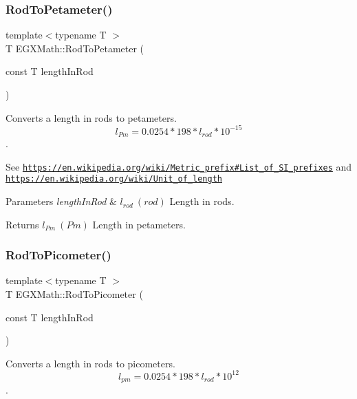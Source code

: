 \subsubsection{\texorpdfstring{Rod\+To\+Petameter()}{RodToPetameter()}}
{\footnotesize\ttfamily template$<$typename T $>$ \\
T E\+G\+X\+Math\+::\+Rod\+To\+Petameter (\begin{DoxyParamCaption}\item[{const T}]{length\+In\+Rod }\end{DoxyParamCaption})}



Converts a length in rods to petameters. \[ l_{Pm}=0.0254 * 198 * l_{rod} * 10^{-15} \]. 

See \href{https://en.wikipedia.org/wiki/Metric_prefix#List_of_SI_prefixes}{\tt https\+://en.\+wikipedia.\+org/wiki/\+Metric\+\_\+prefix\#\+List\+\_\+of\+\_\+\+S\+I\+\_\+prefixes} and \href{https://en.wikipedia.org/wiki/Unit_of_length}{\tt https\+://en.\+wikipedia.\+org/wiki/\+Unit\+\_\+of\+\_\+length} 
\begin{DoxyParams}{Parameters}
{\em length\+In\+Rod} & $ l_{rod}\ (rod)$ Length in rods. \\
\hline
\end{DoxyParams}
\begin{DoxyReturn}{Returns}
$ l_{Pm}\ (Pm)$ Length in petameters. 
\end{DoxyReturn}
\mbox{\label{group___e_g_x_math-_conversions-_length_conversions-_imperial-_rod-_s_i_ga212e66c6922a0df85714ec8559af8790}} 
\subsubsection{\texorpdfstring{Rod\+To\+Picometer()}{RodToPicometer()}}
{\footnotesize\ttfamily template$<$typename T $>$ \\
T E\+G\+X\+Math\+::\+Rod\+To\+Picometer (\begin{DoxyParamCaption}\item[{const T}]{length\+In\+Rod }\end{DoxyParamCaption})}



Converts a length in rods to picometers. \[ l_{pm}=0.0254 * 198 * l_{rod} * 10^{12} \]. 


